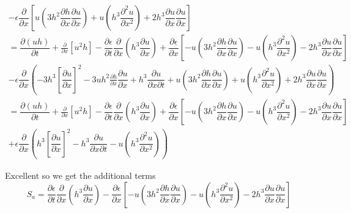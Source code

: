 \documentclass[10pt]{article}
\begin{document}
\begin{multline}
-\epsilon \dfrac{\partial}{\partial x} \left[u\left (3h^2 \dfrac{\partial h}{\partial x} \dfrac{\partial u}{\partial x} \right ) + u \left(h^3 \dfrac{\partial^2 u}{\partial x^2} \right) +2 h^3 \dfrac{\partial u}{\partial x} \dfrac{\partial u}{\partial x} \right]
\\ = \dfrac{\partial (uh)}{\partial t} + \frac{\partial}{\partial x}\left[u^2h\right] -\dfrac{\partial \epsilon}{\partial t}\dfrac{\partial }{\partial x} \left (h^3 \dfrac{\partial u}{\partial x} \right ) +\dfrac{\partial\epsilon}{\partial x} \left[ - u\left (3h^2 \dfrac{\partial h}{\partial x} \dfrac{\partial u}{\partial x} \right ) - u \left(h^3 \dfrac{\partial^2 u}{\partial x^2} \right) -2 h^3 \dfrac{\partial u}{\partial x} \dfrac{\partial u}{\partial x} \right] \\ - \epsilon\dfrac{\partial }{ \partial x} \left (-3h^3 \left[\dfrac{\partial u}{\partial x}\right]^2 -3uh^2 \frac{\partial h}{\partial x}\dfrac{\partial u}{\partial x} + h^3 \dfrac{\partial u}{\partial x \partial t} 
 + u\left (3h^2 \dfrac{\partial h}{\partial x} \dfrac{\partial u}{\partial x} \right ) + u \left(h^3 \dfrac{\partial^2 u}{\partial x^2} \right) +2 h^3 \dfrac{\partial u}{\partial x} \dfrac{\partial u}{\partial x} \right )
 \\ = \dfrac{\partial (uh)}{\partial t} + \frac{\partial}{\partial x}\left[u^2h\right] -\dfrac{\partial \epsilon}{\partial t}\dfrac{\partial }{\partial x} \left (h^3 \dfrac{\partial u}{\partial x} \right ) +\dfrac{\partial\epsilon}{\partial x} \left[ - u\left (3h^2 \dfrac{\partial h}{\partial x} \dfrac{\partial u}{\partial x} \right ) - u \left(h^3 \dfrac{\partial^2 u}{\partial x^2} \right) -2 h^3 \dfrac{\partial u}{\partial x} \dfrac{\partial u}{\partial x} \right] \\ + \epsilon\dfrac{\partial }{ \partial x} \left (h^3 \left[\dfrac{\partial u}{\partial x}\right]^2  - h^3 \dfrac{\partial u}{\partial x \partial t} 
 - u \left(h^3 \dfrac{\partial^2 u}{\partial x^2} \right)  \right )
\end{multline}

Excellent so we get the additional terms
\[S_a = \dfrac{\partial \epsilon}{\partial t}\dfrac{\partial }{\partial x} \left (h^3 \dfrac{\partial u}{\partial x} \right ) -\dfrac{\partial\epsilon}{\partial x} \left[ - u\left (3h^2 \dfrac{\partial h}{\partial x} \dfrac{\partial u}{\partial x} \right ) - u \left(h^3 \dfrac{\partial^2 u}{\partial x^2} \right) -2 h^3 \dfrac{\partial u}{\partial x} \dfrac{\partial u}{\partial x} \right]\]
\end{document}
